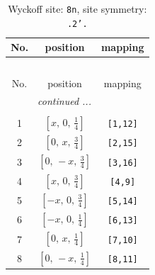 \documentclass[fleqn,8pt]{jsarticle}
\begin{document}
\begin{longtable}{ccc}
\caption{Wyckoff site: {\tt 8n}, site symmetry: {\tt .2'.}}
 \\
 \hline \hline
No. & position & mapping \\ \hline \endfirsthead

\multicolumn{2}{l}{\tablename\ \thetable{}} \\
 \hline \hline
No. & position & mapping \\ \hline \endhead

 \hline \hline
\multicolumn{2}{r}{\footnotesize\it continued ...} \\ \endfoot

 \hline \hline
\multicolumn{2}{r}{} \\ \endlastfoot

1 & $\left[ x,\, 0,\, \frac{1}{4} \right]$ & {\tt [1,12]} \\ \hline
2 & $\left[ 0,\, x,\, \frac{3}{4} \right]$ & {\tt [2,15]} \\ \hline
3 & $\left[ 0,\, - x,\, \frac{3}{4} \right]$ & {\tt [3,16]} \\ \hline
4 & $\left[ x,\, 0,\, \frac{3}{4} \right]$ & {\tt [4,9]} \\ \hline
5 & $\left[ - x,\, 0,\, \frac{3}{4} \right]$ & {\tt [5,14]} \\ \hline
6 & $\left[ - x,\, 0,\, \frac{1}{4} \right]$ & {\tt [6,13]} \\ \hline
7 & $\left[ 0,\, x,\, \frac{1}{4} \right]$ & {\tt [7,10]} \\ \hline
8 & $\left[ 0,\, - x,\, \frac{1}{4} \right]$ & {\tt [8,11]} \\
\end{longtable}
\renewcommand{\arraystretch}{1.2}
\end{document}
